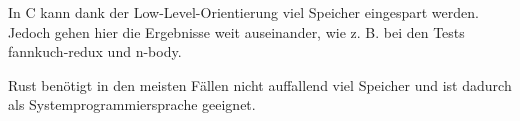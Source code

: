 In C kann dank der Low-Level-Orientierung viel Speicher eingespart werden. Jedoch gehen hier die Ergebnisse weit auseinander, wie z. B. bei den Tests \glqq fannkuch-redux\grqq{} und \glqq n-body\grqq{}.

Rust benötigt in den meisten Fällen nicht auffallend viel Speicher und ist dadurch als Systemprogrammiersprache geeignet.



